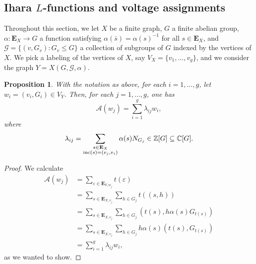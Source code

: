 \documentclass[11pt]{amsart}
\newtheorem{proposition}[theorem]{Proposition}
\numberwithin{equation}{section}
\theoremstyle{remark}
\theoremstyle{definition}
\begin{document}
\subsection{Ihara \texorpdfstring{$L$}{L}-functions and voltage assignments} \label{Ihar}
Throughout this section, we let $X$ be a finite graph, $G$ a finite abelian group, $\alpha:\mathbf{E}_{X} \rightarrow G$ a function satisfying $\alpha(\bar{s}) = \alpha(s)^{-1}$ for all $s \in \mathbf{E}_{X}$, and $\mathcal{G} =\{(v,G_{v}):G_{v} \le G \}$ a collection of subgroups of $G$ indexed by the vertices of $X$.  We pick a labeling of the vertices of $X$, say $V_{X} = \{v_{1},\ldots,v_{g} \}$, and we consider the graph $Y = X(G,\mathcal{G},\alpha)$.
\begin{proposition} \label{exp_adj_op}
With the notation as above, for each $i=1,\ldots,g$, let $w_{i} = (v_{i},G_{i}) \in V_{Y}$.  Then, for each $j=1,\ldots,g$, one has
$$\mathcal{A}(w_{j}) = \sum_{i=1}^{g}\lambda_{ij}w_{i},$$
where
$$\lambda_{ij} = \sum_{\substack{s \in \mathbf{E}_{X} \\ {\rm inc}(s) = (v_{j},v_{i})}}\alpha(s) N_{G_{j}} \in \mathbb{Z}[G] \subseteq \mathbb{C}[G]. $$
\end{proposition}
\begin{proof}
We calculate
\begin{equation*}
\begin{aligned}
\mathcal{A}(w_{j}) &= \sum_{\varepsilon \in \mathbf{E}_{Y,w_{j}}} t(\varepsilon) \\
&= \sum_{s \in \mathbf{E}_{X,v_{j}}} \sum_{h \in G_{j}} t((s,h)) \\
&= \sum_{s \in \mathbf{E}_{X,v_{j}}} \sum_{h \in G_{j}} (t(s),h\alpha(s)G_{t(s)}) \\
&= \sum_{s \in \mathbf{E}_{X,v_{j}}} \sum_{h \in G_{j}} h \alpha(s) (t(s),G_{t(s)}) \\
&= \sum_{i=1}^{g} \lambda_{ij} w_{i},
\end{aligned}
\end{equation*}
as we wanted to show.
\end{proof}
\end{document}
